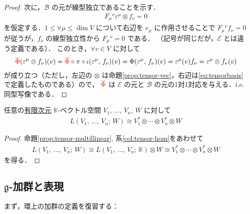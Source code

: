 \documentclass[rep_main]{subfiles}
\begin{document}
\begin{proof}
{        次に，$\mathcal{B}$ の元が線型独立であることを示す．
        \begin{align}
            F_{\mu}{}^\nu \varepsilon^\mu \otimes f_\nu = 0
        \end{align}
        を仮定する．$1 \le \forall \mu \le \dim V$ について右辺を $e_\mu$ に作用させることで $F_\mu{}^\nu f_\nu = 0$ が従うが，$f_\nu$ の線型独立性から $F_{\mu}{}^\nu = 0$ である．
    }
    （記号が同じだが，$\mathcal{E}$ とは違う定義である）．
	このとき，$\forall v \in V$ に対して
	\begin{align}
		\textcolor{red}{\overline{\Phi}}(\varepsilon^\mu \otimes f_\nu )(v) = \textcolor{red}{\overline{\Phi}} \circ \pi \circ \iota(\varepsilon^\mu,\, f_\nu )(v) = \Phi(\varepsilon^\mu,\, f_\nu)(v) = \varepsilon^\mu (v) f_\nu = \varepsilon^\mu \otimes f_\nu(v)
	\end{align}
	が成り立つ（ただし，左辺の $\otimes$ は命題\ref{prop:tensor-vec}，右辺は\eqref{eq:tensorbasis}で定義したものである）ので，
	$\textcolor{red}{\overline{\Phi}}$ は $\mathcal{E}$ の元と $\mathcal{B}$ の元の1対1対応を与える．i.e. 同型写像である．
\end{proof}

\begin{mycol}[label=col:tensor-multillinear]{}
    任意の\underline{有限次元} $\mathbb{K}$-ベクトル空間 $V_1,\, \dots,\, V_n,\, W$ に対して
    \begin{align}
        L(V_1,\, \dots,\, V_n;\, W) \cong V_1^* \otimes \cdots \otimes V_n^* \otimes W
    \end{align}
\end{mycol}

\begin{proof}
    命題\ref{prop:tensor-multillinear}, 系\ref{col:tensor-hom}をあわせて
    \begin{align}
        L(V_1,\, \dots,\, V_n;\, W) \cong L(V_1,\, \dots,\, V_n;\, \mathbb{K}) \otimes W \cong V_1^* \otimes \cdots \otimes V_n^* \otimes W
    \end{align}
    を得る．
\end{proof}

\subsection{$\mathfrak{g}$-加群と表現}

まず，環上の加群の定義を復習する：
\end{document}
